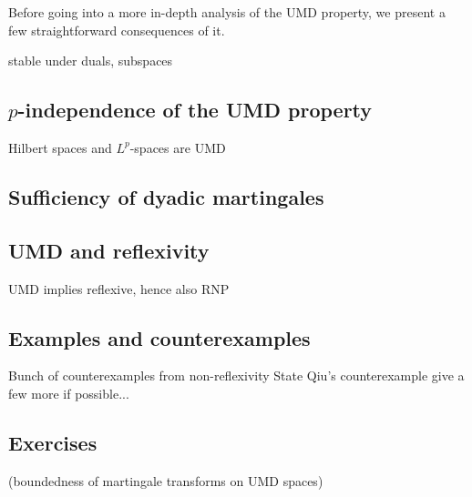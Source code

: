Before going into a more in-depth analysis of the UMD property, we present a few straightforward consequences of it.


\begin{prop}
  stable under duals, subspaces
\end{prop}



\subsection{$p$-independence of the UMD property}\label{sec:UMD-p-independence}

\begin{cor}
  Hilbert spaces and $L^p$-spaces are UMD
\end{cor}

\subsection{Sufficiency of dyadic martingales}

\subsection{UMD and reflexivity}

UMD implies reflexive, hence also RNP

\subsection{Examples and counterexamples}

Bunch of counterexamples from non-reflexivity
State Qiu's counterexample
give a few more if possible...

\subsection*{Exercises}

\begin{exercise}
  (boundedness of martingale transforms on UMD spaces)
\end{exercise}


